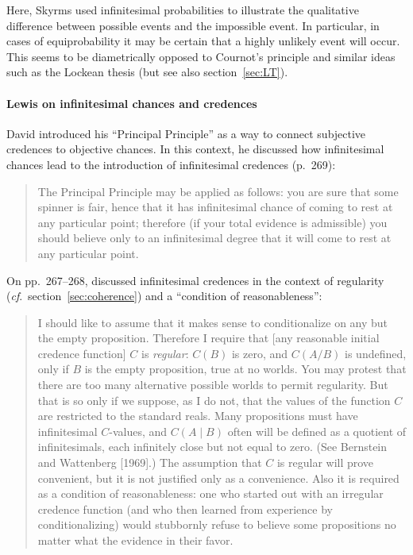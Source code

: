 Here, Skyrms used infinitesimal probabilities to illustrate the qualitative difference between possible events and the impossible event. In particular, in cases of equiprobability it may be certain that a highly unlikely event will occur. This seems to be diametrically opposed to Cournot's principle and similar ideas such as the Lockean thesis (but see also section~\ref{sec:LT}).

\paragraph{Lewis on infinitesimal chances and credences}
David \citet{Lewis:1980} introduced his ``Principal Principle'' as a way to connect subjective credences to objective chances. In this context, he discussed how infinitesimal chances lead to the introduction of infinitesimal credences (p.~269):
\begin{quote}
The Principal Principle may be applied as follows: you are sure that some spinner is fair, hence that it has infinitesimal chance of coming to rest at any particular point; therefore (if your total evidence is admissible) you should believe only to an infinitesimal degree that it will come to rest at any particular point.
\end{quote}
On pp.~267--268, \citet{Lewis:1980} discussed infinitesimal credences in the context of regularity (\textit{cf}.\ section~\ref{sec:coherence}) and a ``condition of reasonableness'':
\begin{quote}
I should like to assume that it makes sense to conditionalize on any but the empty proposition. Therefore I require that [any reasonable initial credence function] $C$ is \textit{regular}: $C(B)$ is zero, and $C(A/B)$ is undefined, only if $B$ is the empty proposition, true at no worlds. You may protest that there are too many alternative possible worlds to permit regularity. But that is so only if we suppose, as I do not, that the values of the function $C$ are restricted to the standard reals. Many propositions must have infinitesimal $C$-values, and $C(A \mid B)$ often will be defined as a quotient of infinitesimals, each infinitely close but not equal to zero. (See Bernstein and Wattenberg [1969].) The assumption that $C$ is regular will prove convenient, but it is not justified only as a convenience. Also it is required as a condition of reasonableness: one who started
out with an irregular credence function (and who then learned from experience by conditionalizing) would stubbornly refuse to believe some propositions no matter what the evidence in their favor.
\end{quote}

